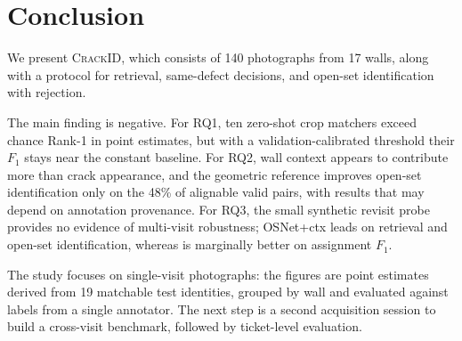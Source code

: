 \section{Conclusion}

We present \textsc{CrackID}, which consists of 140 photographs from 17 walls, along with a protocol for retrieval, same-defect decisions, and open-set identification with rejection.

The main finding is negative.
For RQ1, ten zero-shot crop matchers exceed chance Rank-1 in point estimates, but with a validation-calibrated threshold their $F_1$ stays near the constant baseline.
For RQ2, wall context appears to contribute more than crack appearance, and the geometric reference improves open-set identification only on the 48\% of alignable valid pairs, with results that may depend on annotation provenance.
For RQ3, the small synthetic revisit probe provides no evidence of multi-visit robustness; OSNet+ctx leads on retrieval and open-set identification, whereas \hybrid{} is marginally better on assignment $F_1$.

The study focuses on single-visit photographs: the figures are point estimates derived from 19 matchable test identities, grouped by wall and evaluated against labels from a single annotator.
The next step is a second acquisition session to build a cross-visit benchmark, followed by ticket-level evaluation.

